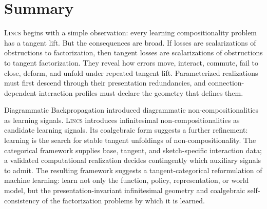 \documentclass{article}
\begin{document}
\section{Summary}

\textsc{Lincs}   begins with a simple observation: every learning compositionality problem has a tangent lift. But the consequences are broad. If losses are scalarizations of obstructions to factorization, then tangent losses are scalarizations of obstructions to tangent factorization. They reveal how errors move, interact, commute, fail to close, deform, and unfold under repeated tangent lift.  Parameterized realizations must first descend through their presentation redundancies, and connection-dependent interaction profiles must declare the geometry that defines them.

Diagrammatic Backpropagation introduced diagrammatic non-compositionalities as learning signals. \textsc{Lincs}   introduces infinitesimal non-compositionalities as candidate learning signals. Its coalgebraic form suggests a further refinement: learning is the search for stable tangent unfoldings of non-compositionality.  The categorical framework supplies base, tangent, and sketch-specific interaction data; a validated computational realization decides contingently which auxiliary signals to admit. The resulting framework suggests a tangent-categorical reformulation of machine learning: learn not only the function, policy, representation, or world model, but the presentation-invariant infinitesimal geometry and coalgebraic self-consistency of the factorization problems by which it is learned.
\end{document}
